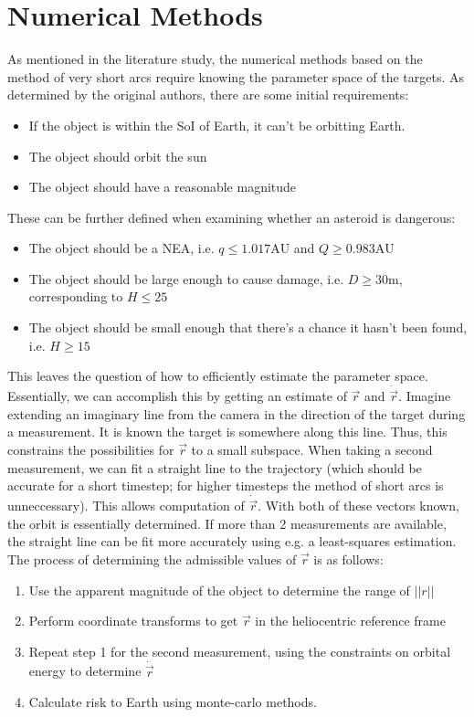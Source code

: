 \documentclass[a4paper,10pt]{article}
\begin{document}
\section{Numerical Methods}

As mentioned in the literature study, the numerical methods based on the method of very short arcs require knowing the parameter space of the targets. As determined by the original authors, there are some initial requirements:
\begin{itemize}
 \item If the object is within the SoI of Earth, it can't be orbitting Earth.
 \item The object should orbit the sun
 \item The object should have a reasonable magnitude
\end{itemize}
These can be further defined when examining whether an asteroid is dangerous:
\begin{itemize}
 \item The object should be a NEA, i.e. $q \leq 1.017\mathrm{AU}$ and $Q \geq 0.983\mathrm{AU}$
 \item The object should be large enough to cause damage, i.e. $D\geq30\mathrm{m}$, corresponding to $H \leq 25$
 \item The object should be small enough that there's a chance it hasn't been found, i.e. $H \geq 15$
\end{itemize}

This leaves the question of how to efficiently estimate the parameter space. Essentially, we can accomplish this by getting an estimate of $\vec{r}$ and $\dot{\vec{r}}$. Imagine extending an imaginary line from the camera in the direction of the target during a measurement. It is known the target is somewhere along this line. Thus, this constrains the possibilities for $\vec{r}$ to a small subspace. When taking a second measurement, we can fit a straight line to the trajectory (which should be accurate for a short timestep; for higher timesteps the method of short arcs is unneccessary). This allows computation of $\dot{\vec{r}}$. With both of these vectors known, the orbit is essentially determined. If more than 2 measurements are available, the straight line can be fit more accurately using e.g. a least-squares estimation.\\

The process of determining the admissible values of $\vec{r}$ is as follows:
\begin{enumerate}
 \item Use the apparent magnitude of the object to determine the range of $||r||$
 \item Perform coordinate transforms to get $\vec{r}$ in the heliocentric reference frame
 \item Repeat step 1 for the second measurement, using the constraints on orbital energy to determine $\dot{\vec{r}}$
 \item Calculate risk to Earth using monte-carlo methods.
\end{enumerate}
\end{document}
